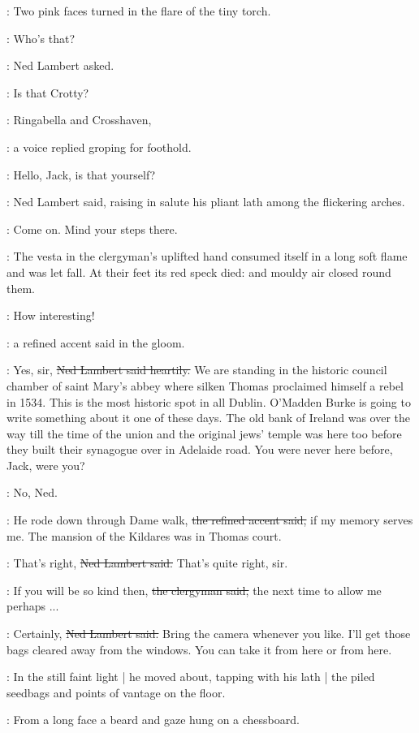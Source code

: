 :
Two pink faces turned in the flare of the tiny torch.

\lambert:
Who's that?

:
Ned Lambert asked.

\lambert:
Is that Crotty?

\jjom:
Ringabella and Crosshaven,

:
a voice replied groping for foothold.

\lambert:
Hello, Jack, is that yourself?

:
Ned Lambert said,
raising in salute his pliant lath
among the flickering arches.

\lambert:
Come on.
Mind your steps there.

:
The vesta in the clergyman's uplifted hand consumed itself
in a long soft
flame and was let fall.
At their feet its red speck died:
and mouldy air
closed round them.

\revlove:
How interesting!

:
a refined accent said in the gloom.

\lambert:
Yes, sir,
\sout{Ned Lambert said heartily.}
We are standing in the historic council chamber of saint Mary's abbey
where silken Thomas proclaimed himself a rebel in 1534.
This is the most historic spot in all Dublin.
O'Madden Burke is going to write something about it
one of these days.
The old bank of Ireland was over the way
till the time of the union
and the original jews' temple was here too
before they built their synagogue over in Adelaide road.
You were never here before, Jack,
were you?

\jjom:
No, Ned.

\revlove:
He rode down through Dame walk,
\sout{the refined accent said,}
if my memory serves me.
The mansion of the Kildares was in Thomas court.

\lambert:
That's right,
\sout{Ned Lambert said.}
That's quite right, sir.

\revlove:
If you will be so kind then,
\sout{the clergyman said,}
the next time to allow
me perhaps ...

\lambert:
Certainly,
\sout{Ned Lambert said.}
Bring the camera whenever you like.
I'll get those bags cleared away from the windows.
You can take it from here or from here.

:
In the still faint light |
he moved about,
tapping with his lath |
the piled seedbags and points of vantage on the floor.

:
From a long face
a beard and gaze hung on a chessboard.

